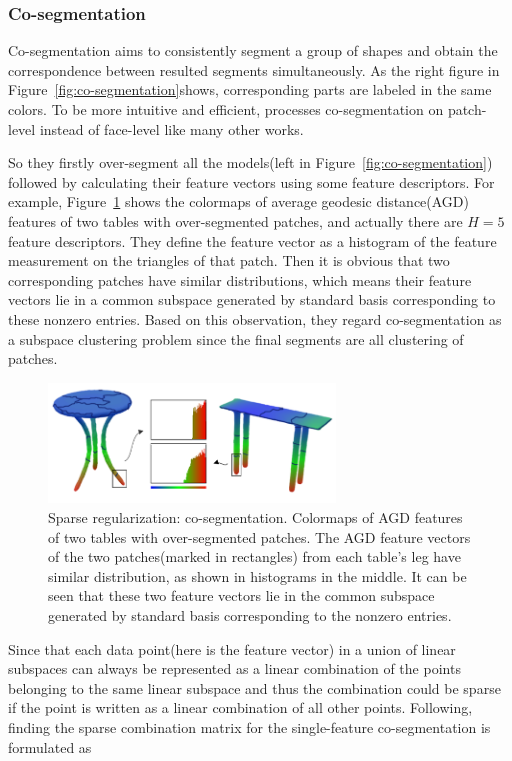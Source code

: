 \subsubsection{Co-segmentation}
\label{subsubsec:co-segmentation}

Co-segmentation aims to consistently segment a group of shapes and obtain the correspondence between resulted segments simultaneously. As the right figure in Figure~\ref{fig:co-segmentation}shows, corresponding parts are labeled in the same colors.
To be more intuitive and efficient, \cite{hu2012co} processes co-segmentation on patch-level instead of face-level like many other works.

So they firstly over-segment all the models(left in Figure~\ref{fig:co-segmentation}) followed by calculating their feature vectors using some feature descriptors.
For example, Figure~\ref{fig:co-segmentationAGD} shows the colormaps of average geodesic distance(AGD) features of two tables with over-segmented patches, and actually there are $H=5$ feature descriptors.
They define the feature vector as a histogram of the feature measurement on the triangles of that patch.
Then it is obvious that two corresponding patches have similar distributions, which means their feature vectors lie in a common subspace generated by standard basis corresponding to these nonzero entries.
Based on this observation, they regard co-segmentation as a subspace clustering problem since the final segments are all clustering of patches.

\begin{figure}[ht]
  \centering
  \includegraphics[width=3in]{images/co-segmentationAGD}
  \caption{Sparse regularization: co-segmentation\cite{hu2012co}. Colormaps of AGD features of two tables with over-segmented patches. The AGD feature vectors of the two patches(marked in rectangles) from each table's leg have similar distribution, as shown in histograms in the middle. It can be seen that these two feature vectors lie in the common subspace generated by standard basis corresponding to the nonzero entries.}
  \label{fig:co-segmentationAGD}
\end{figure}


Since that each data point(here is the feature vector) in a union of linear subspaces can always be represented as a linear combination of the points belonging to the same linear subspace
and thus the combination could be sparse if the point is written as a linear combination of all other points. Following\cite{elhamifar2009sparse,wang2011efficient}, finding the sparse combination matrix for the single-feature co-segmentation is formulated as

